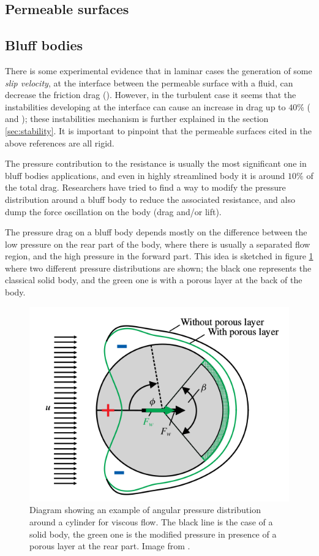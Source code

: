 \subsection{Permeable surfaces}

\subsection{Bluff bodies}

There is some experimental evidence that in laminar cases the generation of some \textit{slip velocity}, at the interface between the permeable surface with a fluid, can decrease the friction drag (\citet{beavers1967boundary}).
However, in the turbulent case it seems that the instabilities developing at the interface can cause an increase in drag up to $40\%$ (\citet{jimenez2001turbulent} and  \citet{breugem2006influence}); these instabilities mechanism is further explained in the section \ref{sec:stability}.
It is important to pinpoint that the permeable surfaces cited in the above references are all rigid.

The pressure contribution to the resistance is usually the most significant one in bluff bodies applications, and even in highly streamlined body it is around $10\%$ of the total drag.
Researchers have tried to find a way to modify the pressure distribution around a bluff body to reduce the associated resistance, and also dump the force oscillation on the body (drag and/or lift).

The pressure drag on a bluff body depends mostly on the difference between the low pressure on the rear part of the body, where there is usually a separated flow region, and the high pressure in the forward part.
This idea is sketched in figure \ref{fig:pressure_dist} where two different pressure distributions are shown; the black one represents the classical solid body, and the green one is with a porous layer at the back of the body.

\begin{figure}[h]
	\centering
	\includegraphics[width=0.4\linewidth]{chapter_1/pressure_dist}
	\caption{Diagram showing an example of angular pressure distribution around a cylinder for viscous flow. The black line is the case of a solid body, the green one is the modified pressure in presence of a porous layer at the rear part. Image from \citet{klausmann2017drag}.}
	\label{fig:pressure_dist}
\end{figure}

